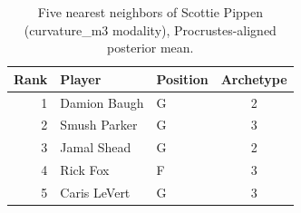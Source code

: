 \begin{table}[htbp]
  \centering\small
  \begin{tabular}{rllc}
    \toprule
    Rank & Player & Position & Archetype \\
    \midrule
    1 & Damion Baugh & G & 2 \\
    2 & Smush Parker & G & 3 \\
    3 & Jamal Shead & G & 2 \\
    4 & Rick Fox & F & 3 \\
    5 & Caris LeVert & G & 3 \\
    \bottomrule
  \end{tabular}
  \caption{Five nearest neighbors of Scottie Pippen (curvature_m3 modality), Procrustes-aligned posterior mean.}
  \label{tab:Scottie_Pippen_neighbors_curvature_m3}
\end{table}

